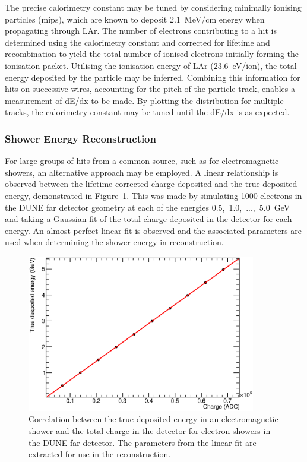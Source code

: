The precise calorimetry constant may be tuned by considering minimally ionising particles (mips), which are known to deposit 2.1~MeV/cm energy when propagating through LAr.  The number of electrons contributing to a hit is determined using the calorimetry constant and corrected for lifetime and recombination to yield the total number of ionised electrons initially forming the ionisation packet.  Utilising the ionisation energy of LAr (23.6~eV/ion), the total energy deposited by the particle may be inferred.  Combining this information for hits on successive wires, accounting for the pitch of the particle track, enables a measurement of dE/dx to be made.  By plotting the distribution for multiple tracks, the calorimetry constant may be tuned until the dE/dx is as expected.

\subsubsection{Shower Energy Reconstruction}\label{sec:ShowerEnergy}

For large groups of hits from a common source, such as for electromagnetic showers, an alternative approach may be employed.  A linear relationship is observed between the lifetime-corrected charge deposited and the true deposited energy, demonstrated in Figure~\ref{fig:ShowerEnergyConversion}.  This was made by simulating 1000 electrons in the DUNE far detector geometry at each of the energies 0.5,~1.0,~...,~5.0~GeV and taking a Gaussian fit of the total charge deposited in the detector for each energy.  An almost-perfect linear fit is observed and the associated parameters are used when determining the shower energy in reconstruction.

\begin{figure}
  \centering
  \includegraphics[width=10cm]{ShowerEnergyConversionFD.eps}
  \caption[Correlation between the true deposited energy in an electromagnetic shower and the total charge in the detector for electron showers in the DUNE far detector.]{Correlation between the true deposited energy in an electromagnetic shower and the total charge in the detector for electron showers in the DUNE far detector.  The parameters from the linear fit are extracted for use in the reconstruction.}
  \label{fig:ShowerEnergyConversion}
\end{figure}

